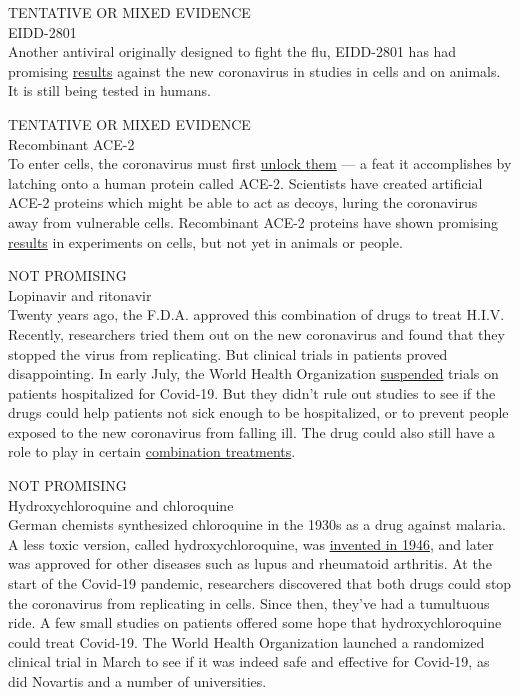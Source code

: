 TENTATIVE OR MIXED EVIDENCE\\
EIDD-2801\\
Another antiviral originally designed to fight the flu, EIDD-2801 has
had promising
\href{https://stm.sciencemag.org/content/12/541/eabb5883}{results}
against the new coronavirus in studies in cells and on animals. It is
still being tested in humans.

TENTATIVE OR MIXED EVIDENCE\\
Recombinant ACE-2\\
To enter cells, the coronavirus must first
\href{https://www.nytimes.com/interactive/2020/03/11/science/how-coronavirus-hijacks-your-cells.html}{unlock
them} --- a feat it accomplishes by latching onto a human protein called
ACE-2. Scientists have created artificial ACE-2 proteins which might be
able to act as decoys, luring the coronavirus away from vulnerable
cells. Recombinant ACE-2 proteins have shown promising
\href{https://doi.org/10.1016/j.cell.2020.04.004}{results} in
experiments on cells, but not yet in animals or people.

NOT PROMISING\\
Lopinavir and ritonavir\\
Twenty years ago, the F.D.A. approved this combination of drugs to treat
H.I.V. Recently, researchers tried them out on the new coronavirus and
found that they stopped the virus from replicating. But clinical trials
in patients proved disappointing. In early July, the World Health
Organization
\href{https://www.who.int/news-room/detail/04-07-2020-who-discontinues-hydroxychloroquine-and-lopinavir-ritonavir-treatment-arms-for-covid-19}{suspended}
trials on patients hospitalized for Covid-19. But they didn't rule out
studies to see if the drugs could help patients not sick enough to be
hospitalized, or to prevent people exposed to the new coronavirus from
falling ill. The drug could also still have a role to play in certain
\href{https://www.thelancet.com/journals/lancet/article/PIIS0140-6736(20)31042-4/fulltext}{combination
treatments}.

NOT PROMISING\\
Hydroxychloroquine and chloroquine\\
German chemists synthesized chloroquine in the 1930s as a drug against
malaria. A less toxic version, called hydroxychloroquine, was
\href{https://www.nature.com/articles/s41421-020-0156-0\#:~:text=Hydroxychloroquine\%20(HCQ)\%20sulfate\%2C\%20a,than\%20CQ\%20in\%20animals4.}{invented
in 1946}, and later was approved for other diseases such as lupus and
rheumatoid arthritis. At the start of the Covid-19 pandemic, researchers
discovered that both drugs could stop the coronavirus from replicating
in cells. Since then, they've had a tumultuous ride. A few small studies
on patients offered some hope that hydroxychloroquine could treat
Covid-19. The World Health Organization launched a randomized clinical
trial in March to see if it was indeed safe and effective for Covid-19,
as did Novartis and a number of universities.

